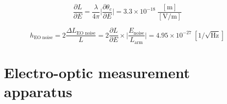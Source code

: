 \begin{equation*}
    \frac{\partial L}{\partial E} = \frac{\lambda}{4 \pi} \bigg| \frac{\partial \theta_c}{\partial E} \bigg| = 3.3 \times 10^{-18} \; \frac{[\mathrm{m}]}{[\mathrm{V/m}]}
\end{equation*}

\begin{equation}
    h_\mathrm{EO\; noise} = 2\frac{\Delta L_\mathrm{EO \; noise}}{L} = 2\frac{\partial L}{\partial E} \times \bigg| \frac{E_\mathrm{noise}}{L_\mathrm{arm}} \bigg| = 4.95 \times 10^{-27} \; [1/ \sqrt{\mathrm{Hz}}]
\end{equation}

\section{Electro-optic measurement apparatus}\label{tanioka2022}

